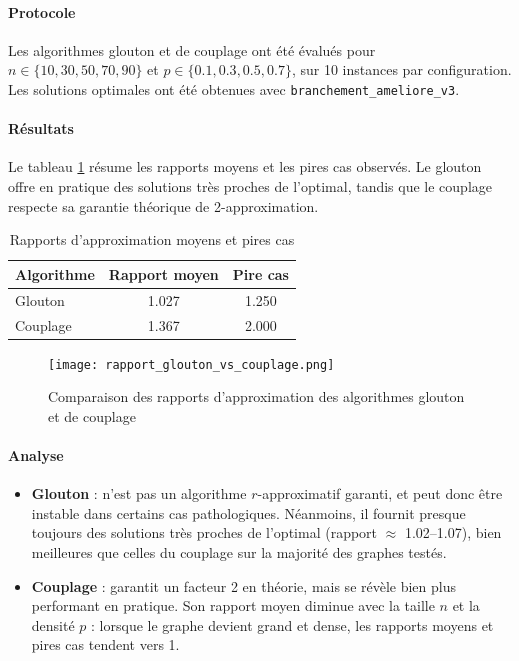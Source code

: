 \documentclass[11pt,a4paper]{article}
\begin{document}
\paragraph{Protocole}
Les algorithmes glouton et de couplage ont été évalués pour $n \in \{10,30,50,70,90\}$ et $p \in \{0.1,0.3,0.5,0.7\}$, sur 10 instances par configuration. Les solutions optimales ont été obtenues avec \texttt{branchement\_ameliore\_v3}.

\paragraph{Résultats}
Le tableau \ref{tab:rapports_approximation} résume les rapports moyens et les pires cas observés.  
Le glouton offre en pratique des solutions très proches de l’optimal, tandis que le couplage respecte sa garantie théorique de 2-approximation.

\begin{table}[H]
\centering
\caption{Rapports d'approximation moyens et pires cas}
\label{tab:rapports_approximation}
\begin{tabular}{lcc}
\hline
Algorithme & Rapport moyen & Pire cas \\
\hline
Glouton & 1.027 & 1.250 \\
Couplage & 1.367 & 2.000 \\
\hline
\end{tabular}
\end{table}

\begin{figure}[H]
  \centering
  \texttt{[image: rapport\_glouton\_vs\_couplage.png]}
  \caption{Comparaison des rapports d'approximation des algorithmes glouton et de couplage}
  \label{fig:rapport_approximation}
\end{figure}

\paragraph{Analyse}
\begin{itemize}
  \item \textbf{Glouton} : n’est pas un algorithme $r$-approximatif garanti, et peut donc être instable dans certains cas pathologiques.  
  Néanmoins, il fournit presque toujours des solutions très proches de l’optimal (rapport $\approx$ 1.02–1.07), bien meilleures que celles du couplage sur la majorité des graphes testés.
  \item \textbf{Couplage} : garantit un facteur 2 en théorie, mais se révèle bien plus performant en pratique.  
  Son rapport moyen diminue avec la taille $n$ et la densité $p$ : lorsque le graphe devient grand et dense, les rapports moyens et pires cas tendent vers 1.
\end{itemize}
\end{document}
